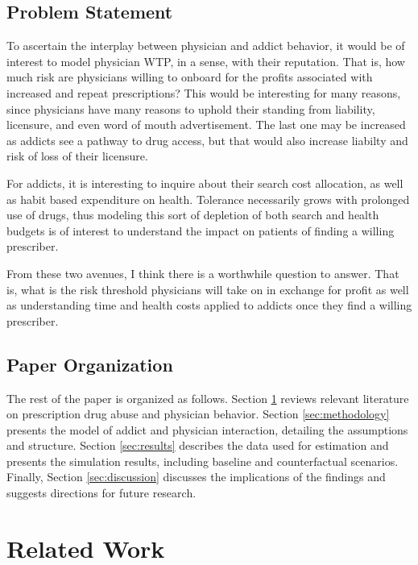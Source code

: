 \documentclass[11pt,a4paper]{article}
\begin{document}
\subsection{Problem Statement}
\label{subsec:problem}

To ascertain the interplay between physician and addict behavior, it would be of interest to model physician WTP, in a sense, with their reputation. That is, how much risk are physicians willing to onboard
for the profits associated with increased and repeat prescriptions? This would be interesting for many reasons, since physicians have many reasons to uphold their standing from liability, licensure, and even
word of mouth advertisement. The last one may be increased as addicts see a pathway to drug access, but that would also increase liabilty and risk of loss of their licensure.

For addicts, it is interesting to inquire about their search cost allocation, as well as habit based expenditure on health. Tolerance necessarily grows with prolonged use of drugs, thus modeling this sort
of depletion of both search and health budgets is of interest to understand the impact on patients of finding a willing prescriber.

From these two avenues, I think there is a worthwhile question to answer. That is, what is the risk threshold physicians will take on in exchange for profit as well as understanding time and health costs applied
to addicts once they find a willing prescriber.


\subsection{Paper Organization}
\label{subsec:organization}

The rest of the paper is organized as follows. Section \ref{sec:related_work} reviews relevant literature on prescription drug abuse and physician behavior. Section \ref{sec:methodology} presents the model of addict and physician interaction, detailing the assumptions and structure. Section \ref{sec:results} describes the data used for estimation and presents the simulation results, including baseline and counterfactual scenarios. Finally, Section \ref{sec:discussion} discusses the implications of the findings and suggests directions for future research.

\section{Related Work}
\label{sec:related_work}
\end{document}
